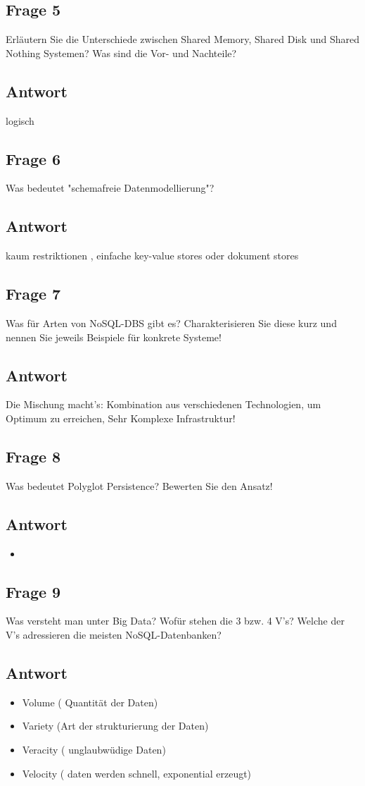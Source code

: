 \subsection*{Frage 5}
Erläutern Sie die Unterschiede zwischen Shared Memory, Shared Disk und Shared Nothing Systemen? Was sind die Vor- und Nachteile?
\subsection*{Antwort}
logisch

\subsection*{Frage 6}
Was bedeutet "schemafreie Datenmodellierung"?
\subsection*{Antwort}
kaum restriktionen , einfache key-value stores oder dokument stores

\subsection*{Frage 7}
Was für Arten von NoSQL-DBS gibt es? Charakterisieren Sie diese kurz und nennen Sie jeweils Beispiele für konkrete Systeme!
\subsection*{Antwort}
Die Mischung macht's: Kombination aus verschiedenen Technologien, um Optimum zu erreichen, 
Sehr Komplexe Infrastruktur!

\subsection*{Frage 8}
Was bedeutet Polyglot Persistence? Bewerten Sie den Ansatz!
\subsection*{Antwort}
\begin{itemize}
	\item 
\end{itemize}

\subsection*{Frage 9}
Was versteht man unter Big Data? Wofür stehen die 3 bzw. 4 V's? Welche der V's adressieren die meisten NoSQL-Datenbanken?
\subsection*{Antwort}
\begin{itemize}
	\item Volume ( Quantität der Daten)
	\item Variety (Art der strukturierung der Daten)
	\item Veracity ( unglaubwüdige Daten)
	\item Velocity ( daten werden schnell, exponential erzeugt)
	
\end{itemize}
